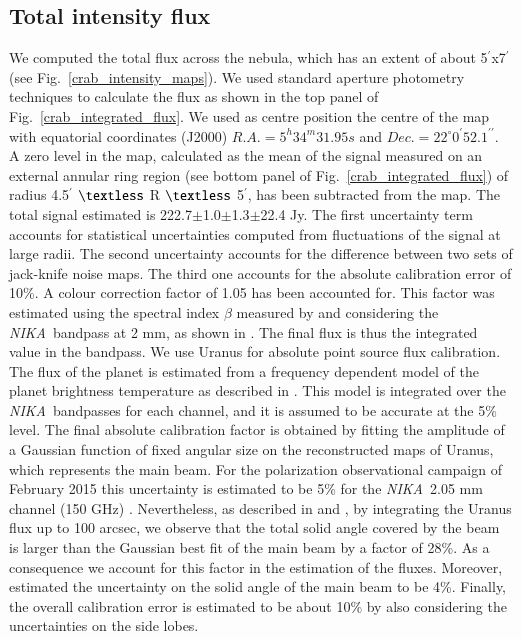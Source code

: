 \documentclass[twocolumn,traditabstract]{aa}
\def\NIKA{\textit{NIKA}}
\begin{document}
\subsection{Total intensity flux}
We computed the total flux across the  nebula, which has an extent of about
5$^{\prime}$x7$^{\prime}$ (see Fig.~\ref{crab_intensity_maps}).  We used
standard aperture photometry techniques to calculate the flux as shown in the top panel of
Fig.~\ref{crab_integrated_flux}. We used as centre position the centre of the
map with equatorial coordinates (J2000) $R.A. = 5^h34^m31.95s$ and $Dec. = 22^{\circ}0^{\prime}52.1^{\prime\prime}$. A zero level in the map, calculated as the mean of the signal measured on
an external annular ring region (see bottom panel of
Fig.~\ref{crab_integrated_flux}) of radius 4.5$^\prime$ $\textless$ R $\textless$
5$^\prime$, has been subtracted from the map. The total signal estimated is
222.7$\pm$1.0$\pm$1.3$\pm$22.4 Jy. The first uncertainty term accounts for statistical
uncertainties computed from fluctuations of the signal at large radii. The second uncertainty accounts for the difference between two sets of jack-knife noise maps. The third one accounts for the absolute calibration error of 10\%. A colour correction factor of 1.05 has been accounted for. This factor was estimated using the spectral index $\beta$ measured by \citet{macias2010} and considering the \NIKA\ bandpass at 2 mm, as shown in \citet{catalano2014}. The final flux is thus the integrated value in the bandpass.
We use Uranus for absolute point source flux calibration. The flux of the planet is estimated from a frequency dependent model of the planet brightness temperature as described in \cite{moreno2010}. 
This model is integrated over the \NIKA\ bandpasses for each channel, and it is assumed to be accurate at the 5\% level. The final absolute calibration factor is obtained by fitting the amplitude of a Gaussian function of fixed angular size on the reconstructed maps of Uranus, which represents the main beam. For the polarization observational campaign of February 2015 this uncertainty is estimated to be 5\% for the \NIKA\ 2.05 mm channel (150 GHz) \citep{ritacco2017}. 
Nevertheless, as described in \cite{adam2013} and \cite{catalano2014}, by integrating the Uranus flux up to 100 arcsec, we observe that the total solid angle covered by the beam is larger than the Gaussian best fit of the main beam by a factor of 28\%. As a consequence we account for this factor in the estimation of the fluxes.
Moreover, \cite{adam2013} estimated the uncertainty on the solid angle of the main beam to be 4\%.
Finally, the overall calibration error is estimated to be about 10\% by also considering  the uncertainties on the side lobes.
\end{document}
